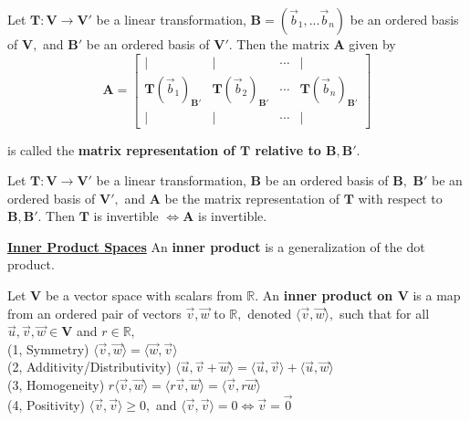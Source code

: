 \documentclass{article}
\begin{document}
\begin{definition}
Let $\boldsymbol{T}: \boldsymbol{V} \rightarrow \boldsymbol{V'}$ be a linear transformation, $\boldsymbol{B} = (\vec{b}_1, ... \vec{b}_n)$ be an ordered basis of $\boldsymbol{V},$ and $\boldsymbol{B'}$ be an ordered basis of $\boldsymbol{V'}.$ Then the matrix $\boldsymbol{A}$ given by 
\[
\boldsymbol{A} =
  \begin{bmatrix}
    | & | & \cdots & | \\
    \boldsymbol{T}(\vec{b}_{1})_{\boldsymbol{B'}} & \boldsymbol{T}(\vec{b}_{2})_{\boldsymbol{B'}} & \cdots & \boldsymbol{T}(\vec{b}_{n})_{\boldsymbol{B'}} \\
    | & | & \cdots & | 
  \end{bmatrix} 
\]

is called the \textbf{matrix representation of $\boldsymbol{T}$ relative to $\boldsymbol{B, B'}$}.

\end{definition}

\begin{theorem}
Let $\boldsymbol{T} : \boldsymbol{V} \rightarrow \boldsymbol{V'}$ be a linear transformation, $\boldsymbol{B}$ be an ordered basis of $\boldsymbol{B},$  $\boldsymbol{B'}$ be an ordered basis of $\boldsymbol{V'},$ and $\boldsymbol{A}$ be the matrix representation of $\boldsymbol{T}$ with respect to $\boldsymbol{B, B'}.$ Then $\boldsymbol{T}$ is invertible $\iff \boldsymbol{A}$ is invertible.
\end{theorem}

\newpage
\underline{\textbf{Inner Product Spaces}}
An \textbf{inner product} is a generalization of the dot product. 
\begin{definition}
Let $\boldsymbol{V}$ be a vector space with scalars from $\mathbb{R}.$ An \textbf{inner product on $\boldsymbol{V}$} is a map from an ordered pair of vectors $\vec{v}, \vec{w}$ to $\mathbb{R},$ denoted $\langle \vec{v}, \vec{w} \rangle,$ such that for all $\vec{u}, \vec{v}, \vec{w} \in \boldsymbol{V}$ and $r \in \mathbb{R},$ \\
(1, Symmetry) $\langle \vec{v}, \vec{w} \rangle  = \langle \vec{w}, \vec{v} \rangle $ \\
(2, Additivity/Distributivity) $\langle \vec{u}, \vec{v} + \vec{w} \rangle  = \langle \vec{u}, \vec{v} \rangle  + \langle \vec{u}, \vec{w} \rangle $ \\
(3, Homogeneity) $r\langle \vec{v}, \vec{w} \rangle  = \langle r\vec{v}, \vec{w} \rangle  = \langle \vec{v}, r\vec{w} \rangle $ \\
(4, Positivity) $\langle \vec{v}, \vec{v} \rangle  \geq 0,$ and $\langle \vec{v}, \vec{v} \rangle  = 0 \iff \vec{v} = \vec{0}$
\end{definition}
\end{document}
